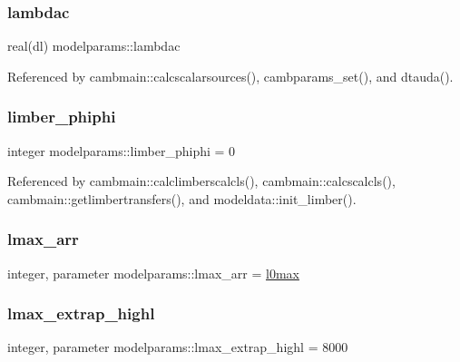 \subsubsection{\texorpdfstring{lambdac}{lambdac}}
{\footnotesize\ttfamily real(dl) modelparams\+::lambdac}



Referenced by cambmain\+::calcscalarsources(), cambparams\+\_\+set(), and dtauda().

\mbox{\label{namespacemodelparams_a0a27a495392838f0bebb4cc754f548c1}} 
\subsubsection{\texorpdfstring{limber\+\_\+phiphi}{limber\_phiphi}}
{\footnotesize\ttfamily integer modelparams\+::limber\+\_\+phiphi = 0}



Referenced by cambmain\+::calclimberscalcls(), cambmain\+::calcscalcls(), cambmain\+::getlimbertransfers(), and modeldata\+::init\+\_\+limber().

\mbox{\label{namespacemodelparams_a68d9b09cb50a8117d4eba3f1dc224627}} 
\subsubsection{\texorpdfstring{lmax\+\_\+arr}{lmax\_arr}}
{\footnotesize\ttfamily integer, parameter modelparams\+::lmax\+\_\+arr = \mbox{\hyperlink{namespacemodelparams_af523f2835472798b89ae123214d8fb99}{l0max}}}

\mbox{\label{namespacemodelparams_a773455ee2416a2e08be5835a1c92fccd}} 
\subsubsection{\texorpdfstring{lmax\+\_\+extrap\+\_\+highl}{lmax\_extrap\_highl}}
{\footnotesize\ttfamily integer, parameter modelparams\+::lmax\+\_\+extrap\+\_\+highl = 8000}



